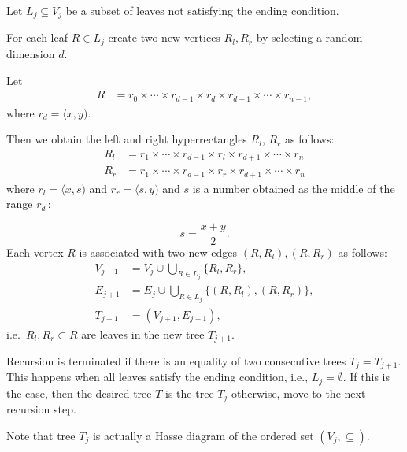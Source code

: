 Let \(L_j \subseteq V_j\) be a subset of leaves not satisfying the
ending condition. 

For each leaf \(R \in L_j\) create two new vertices \(R_l, R_r\) by
selecting a random dimension \(d\).

Let
\begin{align}
R &= r_0 \times  \cdots \times r_{d-1} \times  r_d\times r_{d+1} \times \cdots \times r_{n-1},
\end{align}
where $r_d = \langle x, y ).$ %

Then we obtain the left and right hyperrectangles \(R_l\), \(R_r\) as
follows:
\begin{align}
R_l &= r_1 \times  \cdots \times r_{d-1} \times  r_l \times r_{d+1} \times \cdots \times r_n \\
R_r &= r_1 \times  \cdots \times r_{d-1} \times  r_r \times r_{d+1} \times \cdots \times r_n
\end{align}
where \(r_l = \langle x, s )\) and \(r_r = \langle s, y )\) and \(s\) is
a number obtained as the middle of the range \(r_d\,\):

\[s = \frac{x + y}{2}\tag{x}.\] Each vertex \(R\) is associated with two new
edges \((R,R_l ), (R, R_r)\) as follows:
\begin{align*}
V_{j+1} &= V_j \cup \bigcup_{R \in L_j} \{R_l, R_r\},\\
E_{j+1} &= E_j \cup \bigcup_{R \in L_j} \{(R, R_l), (R,R_r)\},\\
T_{j+1} &= (V_{j+1}, E_{j+1}),
\end{align*}
i.e.~${R_l, R_r} \subset R$ are leaves in the new tree
\(T_{j+1}\).

Recursion is terminated if there is an equality of two consecutive trees \(T_j = T_{j+1}\). This happens when all leaves satisfy the ending condition, i.e., \(L_j = \emptyset\).
If this is the case, then the desired tree $T$ is the tree $T_j$ otherwise, move to the next recursion step.


Note that tree \(T_{j}\) is actually a Hasse diagram of the ordered set
\((V_j,\subseteq)\).


